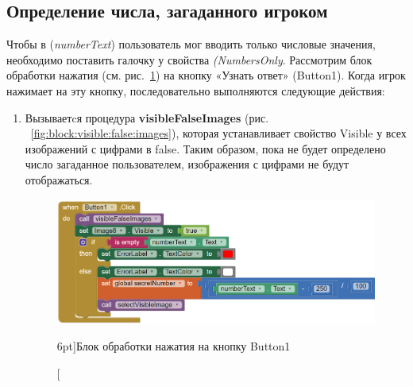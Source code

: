 \subsection{Определение числа, загаданного игроком}
Чтобы в (\textit{numberText}) пользователь мог вводить только числовые значения, необходимо поставить галочку у свойства \textit{(NumbersOnly}. Рассмотрим блок обработки нажатия (см. рис.~\ref{fig:block:button:click}) на кнопку «Узнать ответ» (Button1).
Когда игрок нажимает на эту кнопку, последовательно выполняются следующие действия:
\begin{enumerate}
  \item Вызываетcя процедура \textbf{visibleFalseImages} (рис. ~\ref{fig:block:visible:false:images}), которая устанавливает свойство Visible у всех изображений с цифрами в false. Таким образом, пока не будет определено число загаданное пользователем, изображения с цифрами не будут отображаться.
  \begin{figure}
    \includegraphics{./graphics/programs/guess_numbers/block_Button1Click_AppInventor_2018.png}
      \caption[Блок обработки нажатия на кнопку Button1.][6pt]{Блок обработки нажатия на кнопку Button1}
    \label{fig:block:button:click}
  \end{figure}


\end{enumerate}
